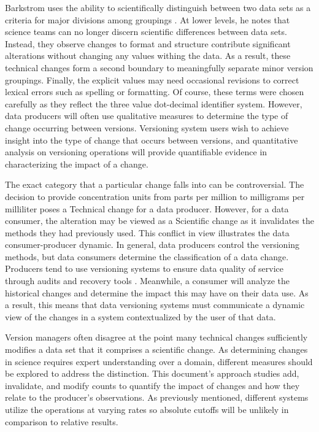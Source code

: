 Barkstrom uses the ability to scientifically distinguish between two data sets as a criteria for major divisions among groupings \cite{Barkstrom2003}.
At lower levels, he notes that science teams can no longer discern scientific differences between data sets.
Instead, they observe changes to format and structure contribute significant alterations without changing any values withing the data.
As a result, these technical changes form a second boundary to meaningfully separate minor version groupings.
Finally, the explicit values may need occasional revisions to correct lexical errors such as spelling or formatting.
Of course, these terms were chosen carefully as they reflect the three value dot-decimal identifier system.
However, data producers will often use qualitative measures to determine the type of change occurring between versions.
Versioning system users wish to achieve insight into the type of change that occurs between versions, and quantitative analysis on versioning operations will provide quantifiable evidence in characterizing the impact of a change.

The exact category that a particular change falls into can be controversial.
The decision to provide concentration units from parts per million to milligrams per milliliter poses a Technical change for a data producer.
However, for a data consumer, the alteration may be viewed as a Scientific change as it invalidates the methods they had previously used.
This conflict in view illustrates the data consumer-producer dynamic.
In general, data producers control the versioning methods, but data consumers determine the classification of a data change.
Producers tend to use versioning systems to ensure data quality of service through audits and recovery tools \cite{Cavanaugh2002}.
Meanwhile, a consumer will analyze the historical changes and determine the impact this may have on their data use.
As a result, this means that data versioning systems must communicate a dynamic view of the changes in a system contextualized by the user of that data.

Version managers often disagree at the point many technical changes sufficiently modifies a data set that it comprises a scientific change.
As determining changes in science requires expert understanding over a domain, different measures should be explored to address the distinction.
This document's approach studies add, invalidate, and modify counts to quantify the impact of changes and how they relate to the producer's observations.
As previously mentioned, different systems utilize the operations at varying rates so absolute cutoffs will be unlikely in comparison to relative results.

